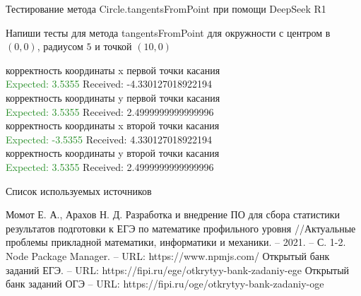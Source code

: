 \documentclass[aspectratio=169,12pt]{beamer}
\newcommand{\greencheck}{{\color{ForestGreen}\Checkmark}}
\newcommand{\redsolid}{{\color{BrickRed}\XSolid}}
\begin{document}
\begin{frame}[fragile]{Тестирование метода Circle.tangentsFromPoint при помощи DeepSeek R1}
	\begin{leftBox}
		Напиши тесты для метода tangentsFromPoint для окружности с центром в $(0,0)$, радиусом $5$ и точкой $(10, 0)$
	\end{leftBox}
	
	\begin{rightBox}
		\redsolid корректность координаты x первой точки касания
		\\\textcolor{ForestGreen}{Expected: 3.5355} 
		\textcolor{BrickRed}{Received: -4.330127018922194} 
		\\\redsolid корректность координаты y первой точки касания
		\\\textcolor{ForestGreen}{Expected: 3.5355} 
		\textcolor{BrickRed}{Received: 2.4999999999999996} 
		\\\redsolid корректность координаты x второй точки касания
		\\\textcolor{ForestGreen}{Expected: -3.5355} 
		\textcolor{BrickRed}{Received: 4.330127018922194} 
		\\\redsolid корректность координаты y второй точки касания
		\\\textcolor{ForestGreen}{Expected: 3.5355} 
		\textcolor{BrickRed}{Received: 2.4999999999999996} 
	\end{rightBox}
\end{frame}

\begin{frame}{Список используемых источников}
	\begin{thebibliography}{10}
		 Момот Е. А., Арахов Н. Д. Разработка и внедрение ПО для сбора статистики результатов подготовки к ЕГЭ по математике профильного уровня //Актуальные проблемы прикладной математики, информатики и механики. – 2021. – С. 1-2.
		 Node Package Manager. – URL: https://www.npmjs.com/
		 Открытый банк заданий ЕГЭ. – URL: https://fipi.ru/ege/otkrytyy-bank-zadaniy-ege
		 Открытый банк заданий ОГЭ – URL:  https://fipi.ru/oge/otkrytyy-bank-zadaniy-oge
	\end{thebibliography}
\end{frame}
\end{document}
